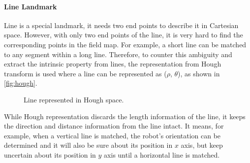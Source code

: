 \paragraph{Line Landmark}\label{par:lineLandmark}
Line is a special landmark, it needs two end points to describe it in Cartesian space. However, with only two end points of the line, it is very hard to find the corresponding points in the field map. For example, a short line can be matched to any segment within a long line. Therefore, to counter this ambiguity and extract the intrinsic property from lines, the representation from Hough transform is used where a line can be represented as ($\rho$, $\theta$), as shown in \autoref{fig:hough}. 
\begin{figure}[h!]
  \centering
   \caption{Line represented in Hough space.}
   \label{fig:hough}
 \end{figure}
While Hough representation discards the length information of the line, it keeps the direction and distance information from the line intact. It means, for example, when a vertical line is matched, the robot's orientation can be determined and it will also be sure about its position in $x$ axis, but keep uncertain about its position in $y$ axis until a horizontal line is matched.


